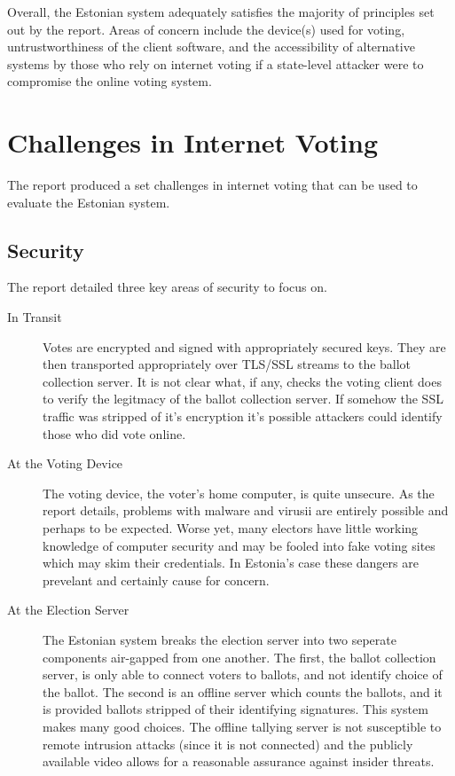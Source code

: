 \documentclass[a4paper, 11pt]{article} %
\begin{document}
Overall, the Estonian system adequately satisfies the majority of principles set out by the report. Areas of concern include the device(s) used for voting, untrustworthiness of the client software, and the accessibility of alternative systems by those who rely on internet voting if a state-level attacker were to compromise the online voting system.


\section*{Challenges in Internet Voting}

The report produced a set challenges in internet voting that can be used to evaluate the Estonian system.

\subsection*{Security}

The report detailed three key areas of security to focus on.

\begin{description}
    \item[In Transit] Votes are encrypted and signed with appropriately secured keys. They are then transported appropriately over TLS/SSL streams to the ballot collection server. It is not clear what, if any, checks the voting client does to verify the legitmacy of the ballot collection server. If somehow the SSL traffic was stripped of it's encryption it's possible attackers could identify those who did vote online.
    \item[At the Voting Device] The voting device, the voter's home computer, is quite unsecure. As the report details, problems with malware and virusii are entirely possible and perhaps to be expected. Worse yet, many electors have little working knowledge of computer security and may be fooled into fake voting sites which may skim their credentials. In Estonia's case these dangers are prevelant and certainly cause for concern.
    \item[At the Election Server] The Estonian system breaks the election server into two seperate components air-gapped from one another. The first, the ballot collection server, is only able to connect voters to ballots, and not identify choice of the ballot. The second is an offline server which counts the ballots, and it is provided ballots stripped of their identifying signatures. This system makes many good choices. The offline tallying server is not susceptible to remote intrusion attacks (since it is not connected) and the publicly available video allows for a reasonable assurance against insider threats.
\end{description}
\end{document}
